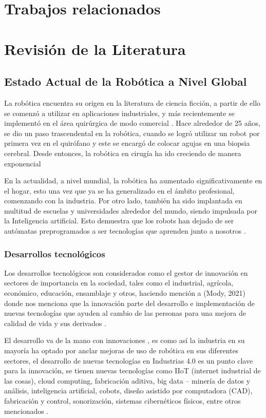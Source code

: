 \documentclass[conference]{IEEEtran}
\begin{document}
\section{Trabajos relacionados}

\section{Revisión de la Literatura}
\subsection{Estado Actual de la Robótica a Nivel Global}
La robótica encuentra su origen en la literatura de ciencia ficción, a partir de ello se comenzó a utilizar en aplicaciones industriales, y más recientemente se implementó en el área quirúrgica de modo comercial \cite{Hockstein2007}. Hace alrededor de 25 años, se dio un paso trascendental en la robótica, cuando se logró utilizar un robot por primera vez en el quirófano y este se encargó de colocar agujas en una biopsia cerebral. Desde entonces, la robótica en cirugía ha ido creciendo de manera exponencial \cite{Shah2015}

En la actualidad, a nivel mundial, la robótica ha aumentado significativamente en el hogar, esto una vez que ya se ha generalizado en el ámbito profesional, comenzando con la industria. Por otro lado, también ha sido implantada en multitud de escuelas y universidades alrededor del mundo, siendo impulsada por la Inteligencia artificial. Esto demuestra que los robots han dejado de ser autómatas preprogramados a ser tecnologías que aprenden junto a nosotros \cite{Castro2018}.

\subsubsection{Desarrollos tecnológicos}

Los desarrollos tecnológicos son considerados como el gestor de innovación en sectores de importancia en la sociedad, tales como el industrial, agrícola, económico, educación, ensamblaje y otros, haciendo mención a (Mody, 2021) donde nos menciona que la innovación parte del desarrollo e implementación de nuevas tecnologías que ayuden al cambio de las personas para una mejora de calidad de vida y sus derivados \cite{Mody2021}.

El desarrollo va de la mano con innovaciones \cite{Malerba2020}, es como así la industria en su mayoría ha optado por anclar mejoras de uso de robótica en sus diferentes sectores, el desarrollo de nuevas tecnologías en Industrias 4.0 es un punto clave para la innovación, se tienen nuevas tecnologías como IIoT (internet industrial de las cosas), cloud computing, fabricación aditiva, big data – minería de datos y análisis, inteligencia artificial, cobots, diseño asistido por computadora (CAD), fabricación y control, sonorización, sistemas cibernéticos físicos, entre otros mencionados \cite{Sharma2020}.
\end{document}
